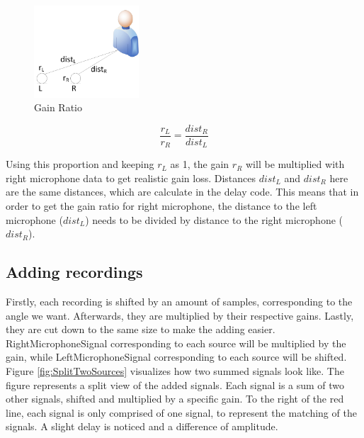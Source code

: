 \begin{figure}[htp]
	\centering
	\includegraphics[width=0.35\textwidth]{Illustrations/gainRatio.jpg}
	\caption{Gain Ratio}
	\label{fig:ratioDependence}
\end{figure}
\begin{equation}
	\frac{r_L}{r_R} = \frac{dist_R}{dist_L}
\end{equation}
 
Using this proportion and keeping \(r_L\) as 1, the gain \(r_R\) will be multiplied 
with right microphone data to get realistic gain loss. Distances \(dist_L\) and 
\(dist_R\) here are the same distances, which are calculate in the delay code. This 
means that in order to get the gain ratio for right microphone, the distance to the 
left microphone (\(dist_L\)) needs to be divided by distance to the right 
microphone (\(dist_R\)).
\newpage
\subsection*{Adding recordings}
Firstly, each recording is shifted by an amount of samples, corresponding to the 
angle we want. Afterwards, they are multiplied by their respective gains. Lastly, 
they are cut down to the same size to make the adding easier. RightMicrophoneSignal 
corresponding to each source will be multiplied by the gain, while LeftMicrophoneSignal  
corresponding to each source will be shifted. Figure \ref{fig:SplitTwoSources} 
visualizes how two summed signals look like. The figure represents a split view of
the added signals. Each signal is a sum of two other signals, shifted and multiplied
by a specific gain. To the right of the red line, each signal is only comprised of
one signal, to represent the matching of the signals. A slight delay is noticed
and a difference of amplitude. 

